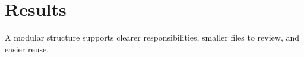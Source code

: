 
\section{Results}
A modular structure supports clearer responsibilities, 
smaller files to review, and easier reuse.
